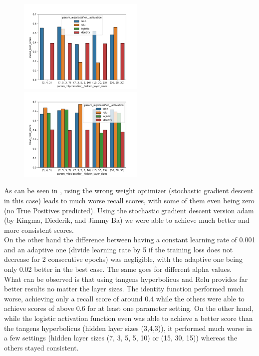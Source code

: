 \begin{figure}
\begin{floatrow}
    {\includegraphics[width=6cm]{plots/mlp_solver_comparisonsgd.png}\label{fig:mlp_sgd}}
    {\includegraphics[width=6cm]{plots/mlp_solver_comparisonadam.png}\label{fig:mlp_adam}}
\end{floatrow}
\end{figure}
As can be seen in , using the wrong weight optimizer (stochastic gradient descent in this case) leads to much worse recall scores, with some of them even being zero (no True Positives predicted). Using the stochastic gradient descent version adam (by Kingma, Diederik, and Jimmy Ba) we were able to achieve much better and more consistent scores.\\
\newline
On the other hand the difference between having a constant learning rate of 0.001 and an adaptive one (divide learning rate by 5 if the training loss does not decrease for 2 consecutive epochs) was negligible, with the adaptive one being only 0.02 better in the best case. The same goes for different alpha values. \\
\newline
What can be observed is that using tangens hyperbolicus and Relu provides far better results no matter the layer sizes. The identity function performed much worse, achieving only a recall score of around 0.4 while the others were able to achieve scores of above 0.6 for at least one parameter setting. On the other hand, while the logistic activation function even was able to achieve a better score than the tangens hyperbolicus (hidden layer sizes (3,4,3)), it performed much worse in a few settings (hidden layer sizes (7, 3, 5, 5, 10) or (15, 30, 15)) whereas the others stayed consistent. \\
